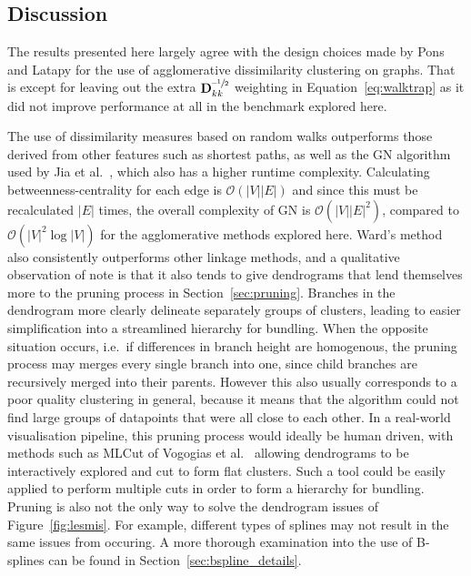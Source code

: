 \subsection{Discussion}
\label{sec:heb_discussion}
The results presented here largely agree with the design choices made by Pons and Latapy \cite{Pons2006} for the use of agglomerative dissimilarity clustering on graphs. That is except for leaving out the extra $\mathbf{D}_{kk}^{\text{--}\sfrac{1}{2}}$ weighting in Equation~\ref{eq:walktrap} as it did not improve performance at all in the benchmark explored here.

The use of dissimilarity measures based on random walks outperforms those derived from other features such as shortest paths, as well as the GN algorithm used by Jia et al.\ \cite{Jia2011}, which also has a higher runtime complexity.
Calculating betweenness-centrality for each edge is $\mathcal{O}(|V||E|)$ \cite{Brandes2001Centrality} and since this must be recalculated $|E|$ times, the overall complexity of GN is $\mathcal{O}(|V||E|^2)$, compared to $\mathcal{O}(|V|^2\log|V|)$ for the agglomerative methods explored here.
Ward's method also consistently outperforms other linkage methods, and a qualitative observation of note is that it also tends to give dendrograms that lend themselves more to the pruning process in Section~\ref{sec:pruning}. Branches in the dendrogram more clearly delineate separately groups of clusters, leading to easier simplification into a streamlined hierarchy for bundling.
When the opposite situation occurs, i.e.\ if differences in branch height are homogenous, the pruning process may merges every single branch into one, since child branches are recursively merged into their parents. However this also usually corresponds to a poor quality clustering in general, because it means that the algorithm could not find large groups of datapoints that were all close to each other.
In a real-world visualisation pipeline, this pruning process would ideally be human driven, with methods such as MLCut of Vogogias et al.\ \cite{Vogogias2016} allowing dendrograms to be interactively explored and cut to form flat clusters. Such a tool could be easily applied to perform multiple cuts in order to form a hierarchy for bundling.
Pruning is also not the only way to solve the dendrogram issues of Figure~\ref{fig:lesmis}. For example, different types of splines may not result in the same issues from occuring.
A more thorough examination into the use of B-splines can be found in Section~\ref{sec:bspline_details}.

